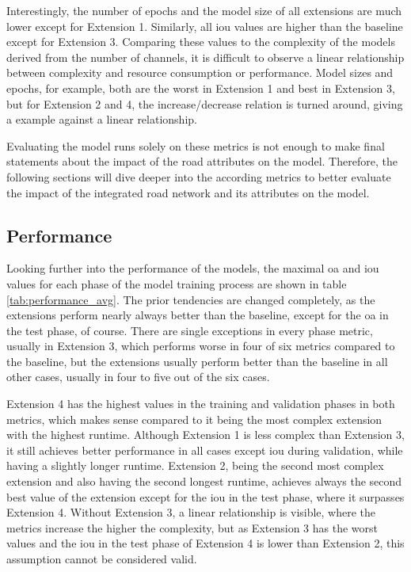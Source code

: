 Interestingly, the number of epochs and the model size of all extensions are much lower except for Extension 1. Similarly, all \gls{iou} values are higher than the baseline except for Extension 3. Comparing these values to the complexity of the models derived from the number of channels, it is difficult to observe a linear relationship between complexity and resource consumption or performance. Model sizes and epochs, for example, both are the worst in Extension 1 and best in Extension 3, but for Extension 2 and 4, the increase/decrease relation is turned around, giving a example against a linear relationship.

Evaluating the model runs solely on these metrics is not enough to make final statements about the impact of the road attributes on the model. Therefore, the following sections will dive deeper into the according metrics to better evaluate the impact of the integrated road network and its attributes on the model.

\subsection{Performance}

Looking further into the performance of the models, the maximal \gls{oa} and \gls{iou} values for each phase of the model training process are shown in table \ref{tab:performance_avg}. The prior tendencies are changed completely, as the extensions perform nearly always better than the baseline, except for the \gls{oa} in the test phase, of course. There are single exceptions in every phase metric, usually in Extension 3, which performs worse in four of six metrics compared to the baseline, but the extensions usually perform better than the baseline in all other cases, usually in four to five out of the six cases.

Extension 4 has the highest values in the training and validation phases in both metrics, which makes sense compared to it being the most complex extension with the highest runtime. Although Extension 1 is less complex than Extension 3, it still achieves better performance in all cases except \gls{iou} during validation, while having a slightly longer runtime. Extension 2, being the second most complex extension and also having the second longest runtime, achieves always the second best value of the extension except for the \gls{iou} in the test phase, where it surpasses Extension 4. Without Extension 3, a linear relationship is visible, where the metrics increase the higher the complexity, but as Extension 3 has the worst values and the \gls{iou} in the test phase of Extension 4 is lower than Extension 2, this assumption cannot be considered valid.

